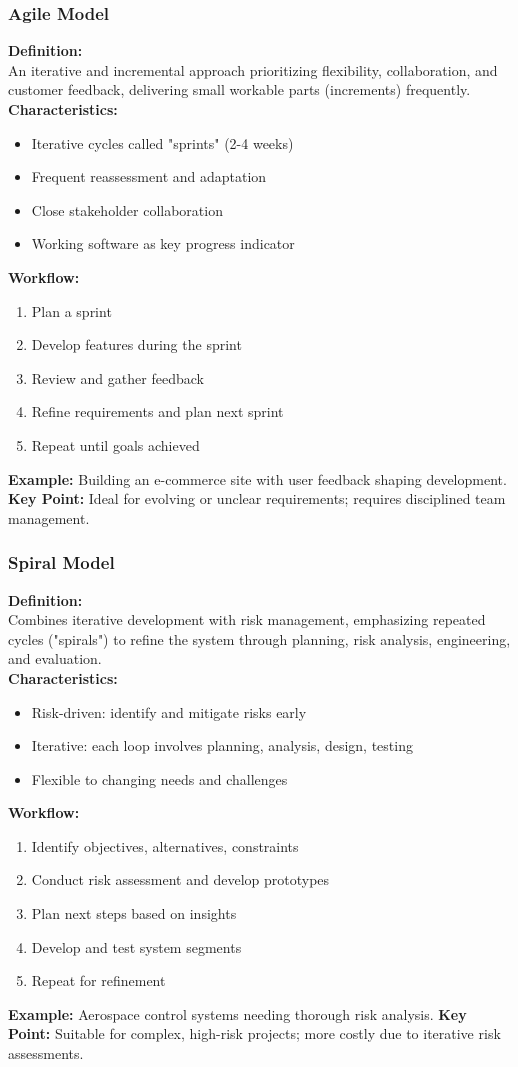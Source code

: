 \documentclass{beamer}
\begin{document}
\begin{frame}[fragile]
  \frametitle{Agile Model}
  \textbf{Definition:} \\
  An iterative and incremental approach prioritizing flexibility, collaboration, and customer feedback, delivering small workable parts (increments) frequently.
  \\
  \textbf{Characteristics:}
  \begin{itemize}
    \item Iterative cycles called "sprints" (2-4 weeks)
    \item Frequent reassessment and adaptation
    \item Close stakeholder collaboration
    \item Working software as key progress indicator
  \end{itemize}
  \textbf{Workflow:}
  \begin{enumerate}
    \item Plan a sprint
    \item Develop features during the sprint
    \item Review and gather feedback
    \item Refine requirements and plan next sprint
    \item Repeat until goals achieved
  \end{enumerate}
  \textbf{Example:} Building an e-commerce site with user feedback shaping development.
  \textbf{Key Point:} Ideal for evolving or unclear requirements; requires disciplined team management.
\end{frame}

\begin{frame}[fragile]
  \frametitle{Spiral Model}
  \textbf{Definition:} \\
  Combines iterative development with risk management, emphasizing repeated cycles ("spirals") to refine the system through planning, risk analysis, engineering, and evaluation.
  \\
  \textbf{Characteristics:}
  \begin{itemize}
    \item Risk-driven: identify and mitigate risks early
    \item Iterative: each loop involves planning, analysis, design, testing
    \item Flexible to changing needs and challenges
  \end{itemize}
  \textbf{Workflow:}
  \begin{enumerate}
    \item Identify objectives, alternatives, constraints
    \item Conduct risk assessment and develop prototypes
    \item Plan next steps based on insights
    \item Develop and test system segments
    \item Repeat for refinement
  \end{enumerate}
  \textbf{Example:} Aerospace control systems needing thorough risk analysis.
  \textbf{Key Point:} Suitable for complex, high-risk projects; more costly due to iterative risk assessments.
\end{frame}
\end{document}

